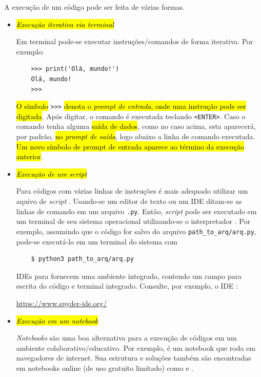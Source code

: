 A execução de um código {\python} pode ser feita de várias formas.

\begin{itemize}
\item \hl{\emph{Execução iterativa via terminal}}

  Em terminal {\python} pode-se executar instruções/comandos de forma iterativa. Por exemplo:
  \begin{lstlisting}
    >>> print('Olá, mundo!')
    Olá, mundo!
    >>> 
  \end{lstlisting}

  \hl{O símbolo }\lstinline+>>>+\hl{ denota o \emph{prompt de entrada}, onde uma instrução {\python} pode ser digitada}. Após digitar, o comando é executada teclando \lstinline+<ENTER>+. Caso o comando tenha alguma \hl{saída de dados}, como no caso acima, esta aparecerá, por padrão, \hl{no \emph{prompt de saída}}, logo abaixo a linha de comando executada. \hl{Um novo símbolo de prompt de entrada aparece ao término da execução anterior}.

\item \hl{\emph{Execução de um {\it script}}}

  Para códigos com várias linhas de instruções é mais adequado utilizar um aquivo de {\it script} {\python}. Usando-se um editor de texto ou um IDE ditam-se as linhas de comando em um arquivo \lstinline+.py+. Então, {\it script} pode ser executado em um terminal de seu sistema operacional utilizando-se o interpretador {\python}. Por exemplo, assumindo que o código for salvo do arquivo \lstinline+path_to_arq/arq.py+, pode-se executá-lo em um terminal do sistema com
  \begin{lstlisting}
    $ python3 path_to_arq/arq.py 
  \end{lstlisting}%
  

  IDEs para {\python} fornecem uma ambiente integrado, contendo um campo para escrita do código e terminal {\python} integrado. Consulte, por exemplo, o IDE {\spyder}:
  \begin{center}
    \url{https://www.spyder-ide.org/}
  \end{center}

\item \hl{\emph{Execução em um \textit{notebook}}}

  {\it Notebooks} {\python} são uma boa alternativa para a execução de códigos em um ambiente colaborativo/educativo. Por exemplo, {\jupyter} é um notebook que roda em navegadores de internet. Sua estrutura e soluções também são encontradas em notebooks online (de uso gratuito limitado) como {\colab} e {\kaggle}.  
\end{itemize}

